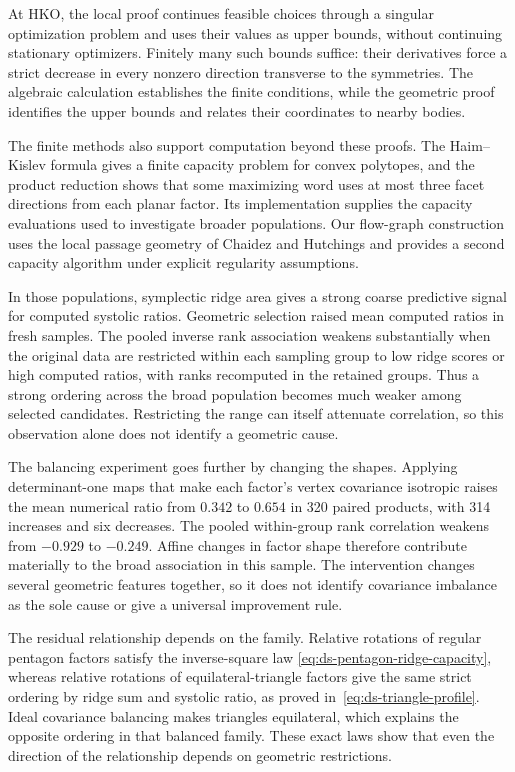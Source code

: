At HKO, the local proof continues feasible choices through a singular
optimization problem and uses their values as upper bounds, without
continuing stationary optimizers. Finitely many such bounds suffice: their
derivatives force a strict decrease in every nonzero direction transverse to the symmetries. The algebraic
calculation establishes the finite conditions, while the geometric proof
identifies the upper bounds and relates their coordinates to nearby bodies.

The finite methods also support computation beyond these proofs. The
Haim--Kislev formula gives a finite capacity problem for convex polytopes,
and the product reduction shows that some maximizing word uses at most three
facet directions from each planar factor. Its implementation supplies the
capacity evaluations used to investigate broader populations. Our flow-graph
construction uses the local passage geometry of Chaidez and Hutchings and
provides a second capacity algorithm under explicit regularity assumptions.

In those populations, symplectic ridge area gives a strong coarse predictive
signal for computed systolic ratios. Geometric selection raised mean
computed ratios in fresh samples. The pooled inverse rank association
weakens substantially when the original data are restricted within each sampling group to low ridge scores
or high computed ratios, with ranks recomputed in the retained groups.
Thus a strong ordering across the broad population becomes much weaker
among selected candidates. Restricting the range can itself attenuate
correlation, so this observation alone does not identify a geometric cause.

The balancing experiment goes further by changing the shapes. Applying
determinant-one maps that make each factor's vertex covariance isotropic
raises the mean numerical ratio from $0.342$ to $0.654$ in 320 paired
products, with 314 increases and six decreases. The pooled within-group
rank correlation weakens from $-0.929$ to $-0.249$. Affine changes in factor
shape therefore contribute materially to the broad association in this
sample. The intervention changes several geometric features together, so
it does not identify covariance imbalance as the sole cause or give a
universal improvement rule.

The residual relationship depends on the family. Relative rotations of
regular pentagon factors satisfy the inverse-square law
\eqref{eq:ds-pentagon-ridge-capacity}, whereas relative rotations of
equilateral-triangle factors give the same strict ordering by ridge sum and
systolic ratio, as proved in~\eqref{eq:ds-triangle-profile}. Ideal covariance
balancing makes triangles equilateral, which explains the opposite ordering
in that balanced family. These exact laws show that even the direction of
the relationship depends on geometric restrictions.

